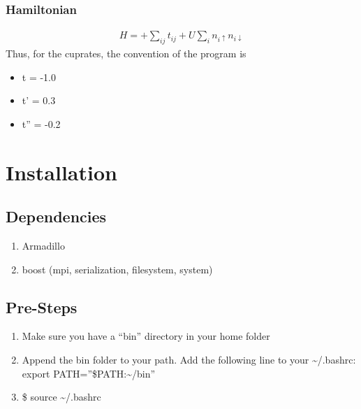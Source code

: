 \documentclass[letterpaper,10pt,english]{sphinxmanual}
\begin{document}
\subsection{Hamiltonian}
\label{\detokenize{intro:hamiltonian}}\begin{equation*}
\begin{split}H = + \sum_{ij} t_{ij} + U \sum_{i} n_{i \uparrow} n_{i \downarrow}\end{split}
\end{equation*}
Thus, for the cuprates, the convention of the program is
\begin{itemize}
\item {} 
t = -1.0

\item {} 
t' = 0.3

\item {} 
t'' = -0.2

\end{itemize}


\chapter{Installation}
\label{\detokenize{installation:installation}}\label{\detokenize{installation:id1}}\label{\detokenize{installation::doc}}

\section{Dependencies}
\label{\detokenize{installation:dependencies}}\begin{enumerate}
\item {} 
Armadillo

\item {} 
boost (mpi, serialization, filesystem, system)

\end{enumerate}


\section{Pre-Steps}
\label{\detokenize{installation:pre-steps}}\begin{enumerate}
\item {} 
Make sure you have a ``bin'' directory in your home folder

\item {} 
Append the bin folder to your path. Add the following line to your \textasciitilde{}/.bashrc:  export PATH=''\$PATH:\textasciitilde{}/bin''

\item {} 
\$ source \textasciitilde{}/.bashrc

\end{enumerate}
\end{document}
